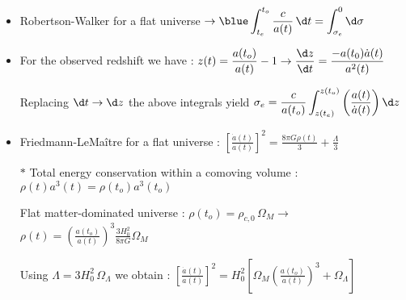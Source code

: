 \Tr
\begin{itemize}
\item Robertson-Walker for a flat universe
      $\displaystyle \rightarrow {\blue \int_{t_{e}}^{t_{o}} \frac{c}{a(t)}\,\d t=\int_{\sigma_{e}}^{0} \d\sigma}$
\item For the observed redshift we have :
      $\displaystyle z(t)=\frac{a(t_{o})}{a(t)}-1
       \rightarrow \frac{\d z}{\d t}=\frac{-a(t_{0})\dot{a}(t)}{a^{2}(t)}$
\item[] Replacing $\d t \rightarrow \d z$ the above integrals yield
        {\blue $\displaystyle \sigma_{e}=\frac{c}{a(t_{o})}
        \int_{z(t_{e})}^{z(t_{o})} \left(\frac{a(t)}{\dot{a}(t)}\right) \d z$}
\item Friedmann-LeMa\^{i}tre for a flat universe : {\red $\displaystyle
      \left[\frac{\dot{a}(t)}{a(t)}\right]^{2}=\frac{8\pi G\rho(t)}{3}+\frac{\Lambda}{3}$}
\item[$\ast$] Total energy conservation within a comoving volume : $\rho(t)a^{3}(t)=\rho(t_{o})a^{3}(t_{o})$
\item[] Flat matter-dominated universe : $\rho(t_{o})=\rho_{c,0}\,\Omega_{M} \rightarrow$
       {\blue $\displaystyle \rho(t)=\left(\frac{a(t_{o})}{a(t)}\right)^{3}\frac{3H_{0}^{2}}{8\pi G}\Omega_{M}$}
\item[] Using {\blue $\Lambda=3H_{0}^{2}\,\Omega_{\Lambda}$} we obtain : {\red $\displaystyle
        \left[\frac{\dot{a}(t)}{a(t)}\right]^{2}
        =H_{0}^{2} \left[\Omega_{M}\left(\frac{a(t_{o})}{a(t)}\right)^{3}+\Omega_{\Lambda}\right]$}
\end{itemize}

